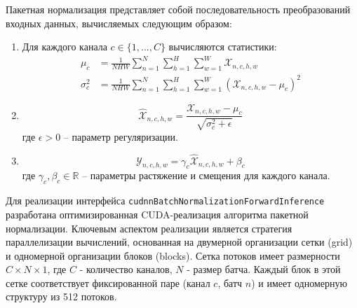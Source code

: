 Пакетная нормализация представляет собой последовательность преобразований входных данных, вычисляемых следующим образом:

\begin{enumerate}
\item Для каждого канала $c \in \{1,...,C\}$ вычисляются статистики:
\begin{align}
\mu_c &= \frac{1}{NHW}\sum_{n=1}^N \sum_{h=1}^H \sum_{w=1}^W \mathcal{X}_{n,c,h,w} \label{eq:batch_mean} \\
\sigma_c^2 &= \frac{1}{NHW}\sum_{n=1}^N \sum_{h=1}^H \sum_{w=1}^W (\mathcal{X}_{n,c,h,w} - \mu_c)^2 \label{eq:batch_var}
\end{align}

\item
\begin{equation}
\hat{\mathcal{X}}_{n,c,h,w} = \frac{\mathcal{X}_{n,c,h,w} - \mu_c}{\sqrt{\sigma_c^2 + \epsilon}} \label{eq:norm_transform}
\end{equation}
где $\epsilon > 0$ -- параметр регуляризации.

\item
\begin{equation}
\mathcal{Y}_{n,c,h,w} = \gamma_c \hat{\mathcal{X}}_{n,c,h,w} + \beta_c \label{eq:affine_transform}
\end{equation}
где $\gamma_c, \beta_c \in \mathbb{R}$ -- параметры растяжение и смещения для каждого канала.
\end{enumerate}

Для реализации интерфейса \texttt{cudnnBatchNormalizationForwardInference} разработана оптимизированная CUDA-реализация алгоритма пакетной нормализации.
Ключевым аспектом реализации является стратегия параллелизации вычислений, основанная на двумерной организации сетки (grid) и одномерной организации блоков (blocks).
Сетка потоков имеет размерности $C \times N \times 1$, где $C$ - количество каналов, $N$ - размер батча. Каждый блок в этой сетке соответствует фиксированной паре
(канал $c$, батч $n$) и имеет одномерную структуру из 512 потоков.

